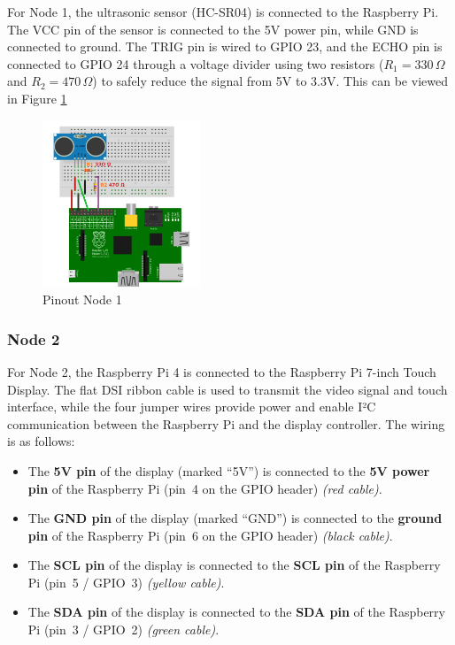 For Node 1, the ultrasonic sensor (HC-SR04) is connected to the Raspberry Pi. The VCC pin of the sensor is connected to the 5V power pin, while GND is connected to ground. The TRIG pin is wired to GPIO 23, and the ECHO pin is connected to GPIO 24 through a voltage divider using two resistors ($R_1 = 330\,\Omega$ and $R_2 = 470\,\Omega$) to safely reduce the signal from 5V to 3.3V. This can be viewed in Figure \ref{fig:node1-pinout}


\begin{figure}[h]
	\includegraphics[height=50mm]{images/pinout_node1.png}
	\centering
	\caption{Pinout Node 1}
	\label{fig:node1-pinout}
\end{figure}

\subsubsection{Node 2}

For Node 2, the Raspberry Pi 4 is connected to the Raspberry Pi 7-inch Touch Display.  
The flat DSI ribbon cable is used to transmit the video signal and touch interface, while the four jumper wires provide power and enable I²C communication between the Raspberry Pi and the display controller. The wiring is as follows:

\begin{itemize}
    \item The \textbf{5V pin} of the display (marked ``5V'') is connected to the \textbf{5V power pin} of the Raspberry Pi (pin~4 on the GPIO header) \emph{(red cable)}.
    \item The \textbf{GND pin} of the display (marked ``GND'') is connected to the \textbf{ground pin} of the Raspberry Pi (pin~6 on the GPIO header) \emph{(black cable)}.
    \item The \textbf{SCL pin} of the display is connected to the \textbf{SCL pin} of the Raspberry Pi (pin~5 / GPIO~3) \emph{(yellow cable)}.
    \item The \textbf{SDA pin} of the display is connected to the \textbf{SDA pin} of the Raspberry Pi (pin~3 / GPIO~2) \emph{(green cable)}.
\end{itemize}


